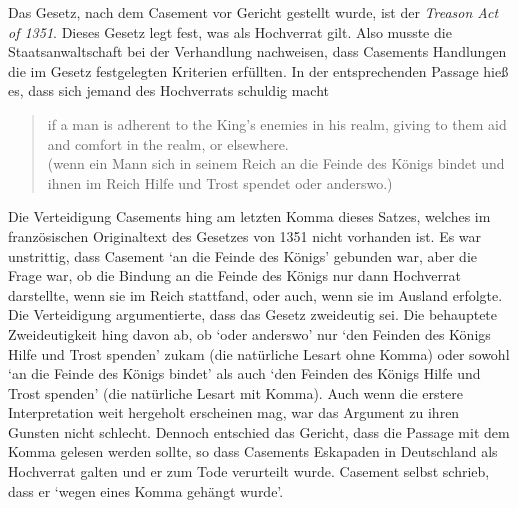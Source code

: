 Das Gesetz, nach dem Casement vor Gericht gestellt wurde, ist der \emph{Treason Act of 1351}. Dieses Gesetz legt fest, was als Hochverrat gilt. Also musste die Staatsanwaltschaft bei der Verhandlung nachweisen, dass Casements Handlungen die im Gesetz festgelegten Kriterien erfüllten. In der entsprechenden Passage hie{\ss} es, dass sich jemand des Hochverrats schuldig macht

\begin{quote}
	if a man is adherent to the King's enemies in his realm, giving to them aid and comfort in the realm, or elsewhere. \\
	(wenn ein Mann sich in seinem Reich an die Feinde des Königs bindet und ihnen im Reich Hilfe und Trost spendet oder anderswo.)
\end{quote}
Die Verteidigung Casements hing am letzten Komma dieses Satzes, welches im französischen Originaltext des Gesetzes von 1351 nicht vorhanden ist. Es war unstrittig, dass Casement `an die Feinde des Königs' gebunden war, aber die Frage war, ob die Bindung an die Feinde des Königs nur dann Hochverrat darstellte, wenn sie im Reich stattfand, oder auch, wenn sie im Ausland erfolgte. Die Verteidigung argumentierte, dass das Gesetz zweideutig sei. Die behauptete Zweideutigkeit hing davon ab, ob `oder anderswo' nur `den Feinden des Königs Hilfe und Trost spenden' zukam (die natürliche Lesart ohne Komma) oder sowohl `an die Feinde des Königs bindet' als auch `den Feinden des Königs Hilfe und Trost spenden' (die natürliche Lesart mit Komma). Auch wenn die erstere Interpretation weit hergeholt erscheinen mag, war das Argument zu ihren Gunsten nicht schlecht. Dennoch entschied das Gericht, dass die Passage mit dem Komma gelesen werden sollte, so dass Casements Eskapaden in Deutschland als Hochverrat galten und er zum Tode verurteilt wurde. Casement selbst schrieb, dass er `wegen eines Komma gehängt wurde'.

